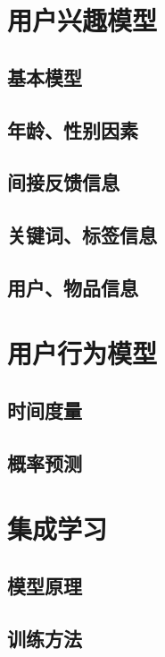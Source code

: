 \documentclass[12pt]{article} %
\begin{document}
\begin{sloppypar}
\newpage
\section{用户兴趣模型}

\subsection{基本模型}

\subsection{年龄、性别因素}

\subsection{间接反馈信息}

\subsection{关键词、标签信息}

\subsection{用户、物品信息}


\newpage
\section{用户行为模型}

\subsection{时间度量}

\subsection{概率预测}

\newpage
\section{集成学习}

\subsection{模型原理}

\subsection{训练方法}



\end{sloppypar}
\end{document}
